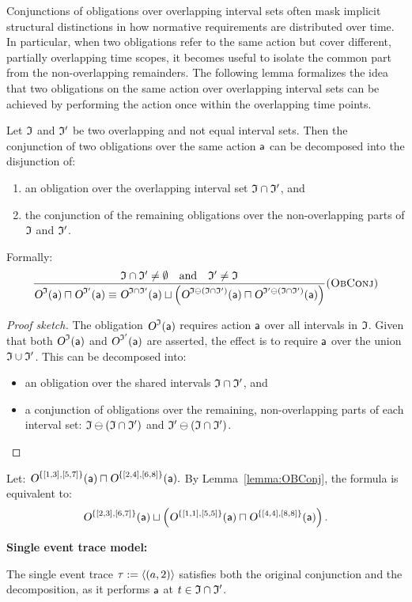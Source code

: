 Conjunctions of obligations over overlapping interval sets often mask implicit structural distinctions in how normative requirements are distributed over time. In particular, when two obligations refer to the same action but cover different, partially overlapping time scopes, it becomes useful to isolate the common part from the non-overlapping remainders. 
The following lemma formalizes the idea that two obligations on the same action over overlapping interval sets can be achieved by performing the action once within the overlapping time points.
\begin{lemma}\label{lemma:OBConj}
Let $\mathfrak{I}$ and $\mathfrak{I}'$ be two overlapping and not equal interval sets. Then the conjunction of two obligations over the same action $\mathsf{a} $ can be decomposed into the disjunction of:
\begin{enumerate}
\item an obligation over the overlapping interval set $\mathfrak{I} \cap \mathfrak{I}'$, and
\item the conjunction of the remaining obligations over the non-overlapping parts of $\mathfrak{I}$ and $\mathfrak{I}'$.
\end{enumerate}
Formally:
\[
\frac{
  \mathfrak{I} \cap \mathfrak{I}' \neq \emptyset \quad \text{and} \quad \mathfrak{I}' \neq \mathfrak{I}
}{
  \textsl{O}^{\mathfrak{I}}(\mathsf{a}) \sqcap \textsl{O}^{\mathfrak{I}'}(\mathsf{a}) \equiv  \textsl{O}^{\mathfrak{I} \cap \mathfrak{I}'}(\mathsf{a}) \sqcup \left( \textsl{O}^{\mathfrak{I} \ominus (\mathfrak{I} \cap \mathfrak{I}')}(\mathsf{a}) \sqcap \textsl{O}^{\mathfrak{I}' \ominus (\mathfrak{I} \cap \mathfrak{I}')}(\mathsf{a}) \right)
}\textsc{(ObConj)}
\]
\end{lemma}


\begin{proof}[Proof sketch]
The obligation $\textsl{O}^{\mathfrak{I}}(\mathsf{a})$ requires action $\mathsf{a} $ over all intervals in $\mathfrak{I}$. Given that both $\textsl{O}^{\mathfrak{I}}(\mathsf{a})$ and $\textsl{O}^{\mathfrak{I}'}(\mathsf{a})$ are asserted, the effect is to require $\mathsf{a} $ over the union $\mathfrak{I} \cup \mathfrak{I}'$. This can be decomposed into:
\begin{itemize}
    \item an obligation over the shared intervals $\mathfrak{I} \cap \mathfrak{I}'$, and
    \item a conjunction of obligations over the remaining, non-overlapping parts of each interval set: $\mathfrak{I} \ominus (\mathfrak{I} \cap \mathfrak{I}')$ and $\mathfrak{I}' \ominus (\mathfrak{I} \cap \mathfrak{I}')$.
\end{itemize}
\end{proof}
\begin{example}
Let:
$
\textsl{O}^{\{[1,3],[5,7]\}}(\mathsf{a}) \sqcap \textsl{O}^{\{[2,4],[6,8]\}}(\mathsf{a}).
$
By Lemma~\ref{lemma:OBConj}, the formula is equivalent to:
\[
\textsl{O}^{\{[2,3],[6,7]\}}(\mathsf{a}) \sqcup \left( \textsl{O}^{\{[1,1],[5,5]\}}(\mathsf{a}) \sqcap \textsl{O}^{\{[4,4],[8,8]\}}(\mathsf{a}) \right).
\]

\noindent\textbf{Single event trace model:}

The single event trace $\tau:= \langle (a,2) \rangle $ satisfies both the original conjunction and the decomposition, as it performs $\mathsf{a} $ at  $t \in \mathfrak{I} \cap \mathfrak{I}'$.
\end{example}

